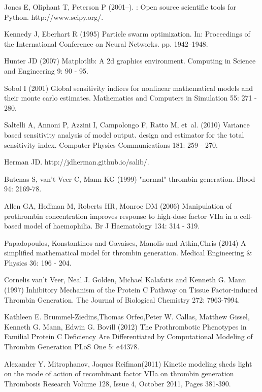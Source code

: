 \documentclass[processes,article,received,moreauthors,pdftex,12pt,a4paper]{mdpi}
\begin{document}
\begin{thebibliography}{9999}
Jones E, Oliphant T, Peterson P (2001--).
: Open source scientific tools for {Python}.
\newblock http://www.scipy.org/.

Kennedy J, Eberhart R (1995) Particle swarm optimization.
\newblock In: Proceedings of the International Conference on Neural Networks.
  pp. 1942--1948.

Hunter JD (2007) Matplotlib: A 2d graphics environment.
\newblock Computing in Science and Engineering 9: 90 - 95.

Sobol I (2001) Global sensitivity indices for nonlinear mathematical models and
  their monte carlo estimates.
\newblock Mathematics and Computers in Simulation 55: 271 - 280.

Saltelli A, Annoni P, Azzini I, Campolongo F, Ratto M, et~al. (2010) Variance
  based sensitivity analysis of model output. design and estimator for the
  total sensitivity index.
\newblock Computer Physics Communications 181: 259 - 270.

Herman JD.
\newblock http://jdherman.github.io/salib/.

Butenas S, van't Veer C, Mann KG (1999) "normal" thrombin generation.
\newblock Blood 94: 2169-78.

Allen GA, Hoffman M, Roberts HR, Monroe DM (2006) Manipulation of prothrombin
  concentration improves response to high-dose factor {VIIa} in a cell-based
  model of haemophilia.
\newblock Br J Haematology 134: 314 - 319.

Papadopoulos, Konstantinos and Gavaises, Manolis and Atkin,Chris (2014) A simplified mathematical model for thrombin generation.
\newblock Medical Engineering \& Physics 36: 196 - 204.

Cornelis van't Veer, Neal J. Golden, Michael Kalafatis and Kenneth G. Mann (1997) Inhibitory Mechanism of the Protein C Pathway on Tissue Factor-induced Thrombin Generation.
\newblock The Journal of Biological Chemistry 272: 7963-7994.

Kathleen E. Brummel-Ziedins,Thomas Orfeo,Peter W. Callas, Matthew Gissel, Kenneth G. Mann, Edwin G. Bovill (2012) The Prothrombotic Phenotypes in Familial Protein C Deficiency Are Differentiated by Computational Modeling of Thrombin Generation
\newblock PLoS One 5: e44378.

Alexander Y. Mitrophanov, Jaques Reifman(2011) Kinetic modeling sheds light on the mode of action of recombinant factor VIIa on thrombin generation
\newblock Thrombosis Research Volume 128, Issue 4, October 2011, Pages 381-390.


\end{thebibliography}
\end{document}
